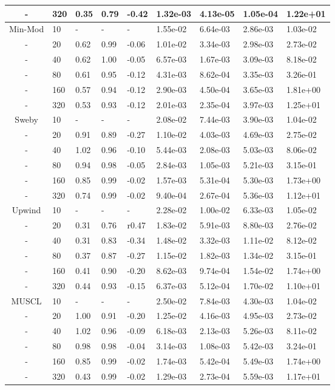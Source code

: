 \begin{table}[p]
{\begin{tabular}{cllllllll}
    - &  320 & 0.35 & 0.79 & -0.42 & 1.32e-03 & 4.13e-05 & 1.05e-04 & 1.22e+01 \\  
   \hline
    Min-Mod &   10 & - & - & - & 1.55e-02 & 6.64e-03 & 2.86e-03 & 1.03e-02  \\ 
    - &   20 & 0.62 & 0.99 & -0.06 & 1.01e-02 & 3.34e-03 & 2.98e-03 & 2.73e-02 \\  
    - &   40 & 0.62 & 1.00 & -0.05 & 6.57e-03 & 1.67e-03 & 3.09e-03 & 8.18e-02 \\  
    - &   80 & 0.61 & 0.95 & -0.12 & 4.31e-03 & 8.62e-04 & 3.35e-03 & 3.26e-01 \\  
    - &  160 & 0.57 & 0.94 & -0.12 & 2.90e-03 & 4.50e-04 & 3.65e-03 & 1.81e+00 \\  
    - &  320 & 0.53 & 0.93 & -0.12 & 2.01e-03 & 2.35e-04 & 3.97e-03 & 1.25e+01 \\  
   \hline
    Sweby &   10 & - & - & - & 2.08e-02 & 7.44e-03 & 3.90e-03 & 1.04e-02  \\ 
    - &   20 & 0.91 & 0.89 & -0.27 & 1.10e-02 & 4.03e-03 & 4.69e-03 & 2.75e-02 \\  
    - &   40 & 1.02 & 0.96 & -0.10 & 5.44e-03 & 2.08e-03 & 5.03e-03 & 8.06e-02 \\  
    - &   80 & 0.94 & 0.98 & -0.05 & 2.84e-03 & 1.05e-03 & 5.21e-03 & 3.15e-01 \\  
    - &  160 & 0.85 & 0.99 & -0.02 & 1.57e-03 & 5.31e-04 & 5.30e-03 & 1.73e+00 \\  
    - &  320 & 0.74 & 0.99 & -0.02 & 9.40e-04 & 2.67e-04 & 5.36e-03 & 1.12e+01 \\  
   \hline
    Upwind &   10 & - & - & - & 2.28e-02 & 1.00e-02 & 6.33e-03 & 1.05e-02  \\ 
    - &   20 & 0.31 & 0.76 & r0.47 & 1.83e-02 & 5.91e-03 & 8.80e-03 & 2.76e-02 \\  
    - &   40 & 0.31 & 0.83 & -0.34 & 1.48e-02 & 3.32e-03 & 1.11e-02 & 8.12e-02 \\  
    - &   80 & 0.37 & 0.87 & -0.27 & 1.15e-02 & 1.82e-03 & 1.34e-02 & 3.15e-01 \\  
    - &  160 & 0.41 & 0.90 & -0.20 & 8.62e-03 & 9.74e-04 & 1.54e-02 & 1.74e+00 \\  
    - &  320 & 0.44 & 0.93 & -0.15 & 6.37e-03 & 5.12e-04 & 1.70e-02 & 1.10e+01 \\  
   \hline
    MUSCL &   10 & - & - & - & 2.50e-02 & 7.84e-03 & 4.30e-03 & 1.04e-02  \\ 
    - &   20 & 1.00 & 0.91 & -0.20 & 1.25e-02 & 4.16e-03 & 4.95e-03 & 2.73e-02 \\  
    - &   40 & 1.02 & 0.96 & -0.09 & 6.18e-03 & 2.13e-03 & 5.26e-03 & 8.11e-02 \\  
    - &   80 & 0.98 & 0.98 & -0.04 & 3.14e-03 & 1.08e-03 & 5.42e-03 & 3.24e-01 \\  
    - &  160 & 0.85 & 0.99 & -0.02 & 1.74e-03 & 5.42e-04 & 5.49e-03 & 1.74e+00 \\  
    - &  320 & 0.43 & 0.99 & -0.02 & 1.29e-03 & 2.73e-04 & 5.59e-03 & 1.17e+01 \\ 
   \hline
   \end{tabular}
   }
\end{table}

